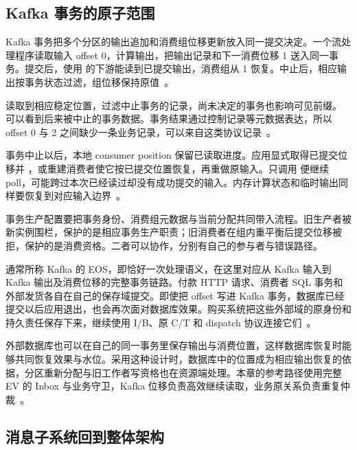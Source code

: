 \subsection{Kafka 事务的原子范围}

Kafka 事务把多个分区的输出追加和消费组位移更新放入同一提交决定。一个流处理程序读取输入 offset 0，计算输出，把输出记录和下一消费位移 1 送入同一事务。提交后，使用  的下游能读到已提交输出，消费组从 1 恢复。中止后，相应输出按事务状态过滤，组位移保持原值~\cite{kafka44-design}。


 读取到相应稳定位置，过滤中止事务的记录，尚未决定的事务也影响可见前缀。 可以看到后来被中止的事务数据。事务结果通过控制记录等元数据表达，所以 offset 0 与 2 之间缺少一条业务记录，可以来自这类协议记录~\cite{kafka44-consumer}。

事务中止以后，本地 consumer position 保留已读取进度。应用显式取得已提交位移并 ，或重建消费者使它按已提交位置恢复，再重做原输入。只调用  便继续 poll，可能跨过本次已经读过却没有成功提交的输入。内存计算状态和临时输出同样要恢复到对应输入边界~\cite{kafka44-consumer}。

事务生产配置要把事务身份、消费组元数据与当前分配共同带入流程。旧生产者被新实例围栏，保护的是相应事务生产职责；旧消费者在组内重平衡后提交位移被拒，保护的是消费资格。二者可以协作，分别有自己的参与者与错误路径。

通常所称 Kafka 的 EOS，即恰好一次处理语义，在这里对应从 Kafka 输入到 Kafka 输出及消费位移的完整事务链路。付款 HTTP 请求、消费者 SQL 事务和外部发货各自在自己的保存域提交。即使把 offset 写进 Kafka 事务，数据库已经提交以后应用退出，也会再次面对数据库效果。购买系统把这些外部域的原身份和持久责任保存下来，继续使用 I/B、原 C/T 和 dispatch 协议连接它们~\cite{kafka44-design}。

外部数据库也可以在自己的同一事务里保存输出与消费位置，这样数据库恢复时能够共同恢复效果与水位。采用这种设计时，数据库中的位置成为相应输出恢复的依据，分区重新分配与旧工作者写资格也在资源端处理。本章的参考路径使用完整 EV 的 Inbox 与业务守卫，Kafka 位移负责高效继续读取，业务原关系负责重复仲裁~\cite{kafka44-consumer}。

\subsection{消息子系统回到整体架构}

